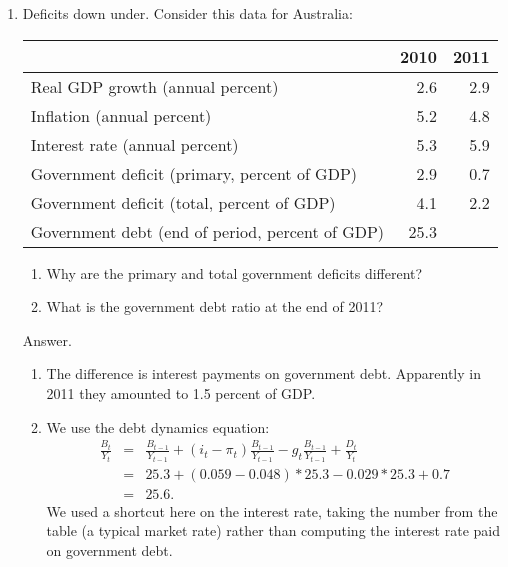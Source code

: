 \setlength{\leftmargini}{.5\oldleftmargini}
\begin{enumerate}
\item Deficits down under.
Consider this data for Australia:
%
\begin{center}
\begin{tabular}{lrr}
\toprule
        & 2010 & 2011 \\
\midrule
Real GDP growth (annual percent) & 2.6 & 2.9 \\
Inflation  (annual percent)      & 5.2 & 4.8 \\
Interest rate  (annual percent)  & 5.3 & 5.9 \\
Government deficit (primary, percent of GDP)    & 2.9 & 0.7 \\
Government deficit (total, percent of GDP)      & 4.1 & 2.2 \\
Government debt (end of period, percent of GDP) & 25.3 \\
\bottomrule
\end{tabular}
\end{center}
\begin{enumerate}
\item Why are the primary and total government deficits different?
\item What is the government debt ratio at the end of 2011?
\end{enumerate}

Answer.
\begin{enumerate}
\item The difference is interest payments on government debt.
Apparently in 2011 they amounted to 1.5 percent of GDP.
\item We use the debt dynamics equation:
\begin{eqnarray*}
    \frac{B_{t}}{Y_t}
            &=&
                \frac{B_{t-1}}{Y_{t-1}} + (i_t-\pi_t) \frac{B_{t-1}}{Y_{t-1}}
                - g_t \frac{B_{t-1}}{Y_{t-1}}
                +  \frac{D_{t}}{Y_{t}}  \\
             &=& 25.3 + (0.059-0.048)*25.3 - 0.029*25.3 + 0.7 \\
             &=&  25.6 .
\end{eqnarray*}
We used a shortcut here on the interest rate, taking the number
from the table (a typical market rate) rather than computing
the interest rate paid on government debt.
\end{enumerate}



\end{enumerate}
